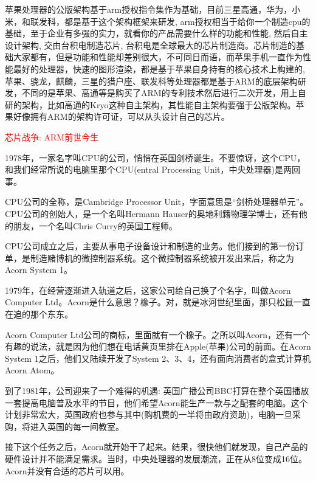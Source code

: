 \documentclass[utf8]{book}
\begin{document}
	苹果处理器的公版架构基于arm授权指令集作为基础，目前三星高通，华为，小米，和联发科，都是基于这个架构框架来研发, arm授权相当于给你一个制造cpu的基础，至于企业有多强的实力，就看你的产品需要什么样的功能和性能, 然后自主设计架构, 交由台积电制造芯片, 台积电是全球最大的芯片制造商。芯片制造的基础大家都有，但是功能和性能却差别很大，不可同日而语，而苹果手机一直作为性能最好的处理器，快速的图形渲染，都是基于苹果自身持有的核心技术上构建的, 苹果、骁龙，麒麟，三星的猎户座、联发科等处理器都是基于ARM的底层架构研发，不同的是苹果、高通等是购买了ARM的专利技术然后进行二次开发，用上自研的架构，比如高通的Kryo这种自主架构，其性能自主架构要强于公版架构。苹果好像拥有ARM的架构许可证，可以从头设计自己的芯片。
	\begin{center}
		{\LARGE \textcolor{red}{芯片战争: ARM前世今生}}
	\end{center}


	1978年，一家名字叫CPU的公司，悄悄在英国剑桥诞生。不要惊讶，这个CPU，和我们经常所说的电脑里那个CPU(entral Processing Unit，中央处理器)是两回事。

	CPU公司的全称，是Cambridge Processor Unit，字面意思是“剑桥处理器单元”。CPU公司的创始人，是一个名叫Hermann Hauser的奥地利籍物理学博士，还有他的朋友，一个名叫Chris Curry的英国工程师。


	CPU公司成立之后，主要从事电子设备设计和制造的业务。他们接到的第一份订单，是制造赌博机的微控制器系统。这个微控制器系统被开发出来后，称之为Acorn System 1。


	1979年，在经营逐渐进入轨道之后，这家公司给自己换了个名字，叫做Acorn Computer Ltd。Acorn是什么意思？橡子。对，就是冰河世纪里面，那只松鼠一直在追的那个东东。

	\begin{figure}[H]
		\centering
	\end{figure}
	Acorn Computer Ltd公司的商标，里面就有一个橡子。之所以叫Acorn，还有一个有趣的说法，就是因为他们想在电话黄页里排在Apple(苹果)公司的前面。在Acorn System 1之后，他们又陆续开发了System 2、3、4，还有面向消费者的盒式计算机Acorn Atom。

	到了1981年，公司迎来了一个难得的机遇: 英国广播公司BBC打算在整个英国播放一套提高电脑普及水平的节目，他们希望Acorn能生产一款与之配套的电脑。这个计划非常宏大，英国政府也参与其中(购机费的一半将由政府资助)，电脑一旦采购，将进入英国的每一间教室。

	接下这个任务之后，Acorn就开始干了起来。结果，很快他们就发现，自己产品的硬件设计并不能满足需求。当时，中央处理器的发展潮流，正在从8位变成16位。Acorn并没有合适的芯片可以用。
\end{document}
